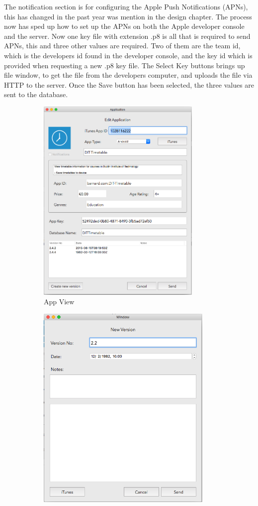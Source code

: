 The notification section is for configuring the Apple Push Notifications (APNs), this has changed in the past year was mention in the design chapter. The process now has sped up how to set up the APNs on both the Apple developer console and the server. Now one key file with extension .p8 is all that is required to send APNs, this and three other values are required. Two of them are the team id, which is the developers id found in the developer console, and the key id which is provided when requesting a new .p8 key file. The Select Key buttons brings up file window, to get the file from the developers computer, and uploads the file via HTTP to the server. Once the Save button has been selected, the three values are sent to the database.

\begin{figure}[!h]
    \begin{subfigure}{0.5\textwidth}
        \includegraphics[width=0.9\linewidth, height=10cm]{images/dashboard/newapp}
        \caption{App View}
        \label{fig:subim1}
    \end{subfigure}
    \begin{subfigure}{0.5\textwidth}
        \includegraphics[width=0.9\linewidth, height=10cm]{images/dashboard/newversion}

\end{subfigure}
\end{figure}

